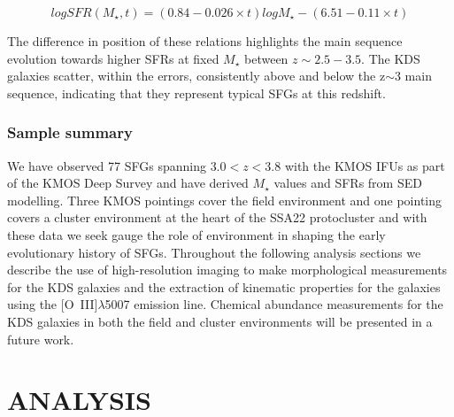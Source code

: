 \documentclass[fleqn,usenatbib]{mn2e}
\begin{document}
\begin{equation}\label{eq:speagle_ms}
logSFR(M_{\star}, t) = (0.84 - 0.026 \times t)logM_{\star} - (6.51 - 0.11 \times t)
\end{equation}

The difference in position of these relations highlights the main sequence evolution towards higher SFRs at fixed $M_{\star}$ between $z\sim2.5-3.5$.
The KDS galaxies scatter, within the errors, consistently above and below the z$\sim3$ main sequence, indicating that they represent typical SFGs at this redshift.

\subsubsection{Sample summary}\label{subsubsec:sample_summary}
We have observed 77 SFGs spanning $3.0 < z < 3.8$ with the KMOS IFUs as part of the KMOS Deep Survey and have derived $M_{\star}$ values and SFRs from SED modelling.
Three KMOS pointings cover the field environment and one pointing covers a cluster environment at the heart of the SSA22 protocluster and with these data we seek gauge the role of environment in shaping the early evolutionary history of SFGs.
Throughout the following analysis sections we describe the use of high-resolution imaging to make morphological measurements for the KDS galaxies and the extraction of kinematic properties for the galaxies using the [O~{\sc III}]$\lambda$5007 emission line.
Chemical abundance measurements for the KDS galaxies in both the field and cluster environments will be presented in a future work.

\section{ANALYSIS}\label{sec:analysis}
\end{document}

